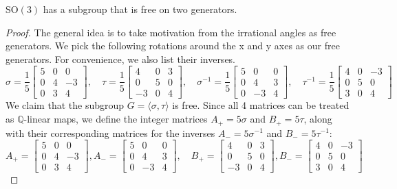   \begin{theorem}
    \label{thm:free-subgroup}
    $\mathrm{SO}(3)$ has a subgroup that is free on two generators. 
  \end{theorem}
  \begin{proof}
    The general idea is to take motivation from the irrational angles as free generators. We pick the following rotations around the x and y axes as our free generators. For convenience, we also list their inverses. 
    \begin{equation}
      \sigma = \frac{1}{5} \begin{bmatrix} 5 & 0 & 0 \\ 0 & 4 & -3 \\ 0 & 3 & 4 \end{bmatrix}, \quad 
      \tau = \frac{1}{5} \begin{bmatrix} 4 & 0 & 3 \\ 0 & 5 & 0 \\ -3 & 0 & 4 \end{bmatrix}, \quad 
      \sigma^{-1} = \frac{1}{5} \begin{bmatrix} 5 & 0 & 0 \\ 0 & 4 & 3 \\ 0 & -3 & 4 \end{bmatrix}, \quad 
      \tau^{-1} = \frac{1}{5} \begin{bmatrix} 4 & 0 & -3 \\ 0 & 5 & 0 \\ 3 & 0 & 4 \end{bmatrix}
    \end{equation} 
    We claim that the subgroup $G = \langle \sigma, \tau \rangle$ is free. Since all 4 matrices can be treated as $\mathbb{Q}$-linear maps, we define the integer matrices $A_+ = 5\sigma$ and $B_+ = 5\tau$, along with their corresponding matrices for the inverses $A_{-} = 5\sigma^{-1}$ and $B_{-} = 5\tau^{-1}$:
    \begin{equation}
      A_{+} = \begin{bmatrix} 5 & 0 & 0 \\ 0 & 4 & -3 \\ 0 & 3 & 4 \end{bmatrix}, A_{-} = \begin{bmatrix} 5 & 0 & 0 \\ 0 & 4 & 3 \\ 0 & -3 & 4 \end{bmatrix}, \quad B_{+} = \begin{bmatrix} 4 & 0 & 3 \\ 0 & 5 & 0 \\ -3 & 0 & 4 \end{bmatrix}, B_{-} = \begin{bmatrix} 4 & 0 & -3 \\ 0 & 5 & 0 \\ 3 & 0 & 4 \end{bmatrix}

\end{equation}
\end{proof}
